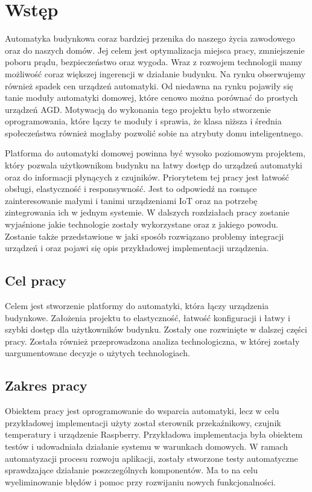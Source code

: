 \chapter{Wstęp}
Automatyka budynkowa coraz bardziej przenika do naszego życia zawodowego oraz do naszych domów. Jej celem jest optymalizacja miejsca pracy, zmniejszenie poboru prądu, bezpieczeństwo oraz wygoda. Wraz z rozwojem technologii mamy możliwość coraz większej ingerencji w działanie budynku. Na rynku obserwujemy również spadek cen urządzeń automatyki. Od niedawna na rynku pojawiły się tanie moduły automatyki domowej, które cenowo można porównać do prostych urządzeń AGD. Motywacją do wykonania tego projektu było stworzenie oprogramowania, które łączy te moduły i sprawia, że klasa niższa i średnia społeczeństwa również mogłaby pozwolić sobie na atrybuty domu inteligentnego. \par
Platforma do automatyki domowej powinna być wysoko poziomowym projektem, który pozwala użytkownikom budynku na łatwy dostęp do urządzeń automatyki oraz do informacji płynących z czujników. Priorytetem tej pracy jest łatwość obsługi, elastyczność i responsywność. Jest to odpowiedź na rosnące zainteresowanie małymi i tanimi urządzeniami IoT oraz na potrzebę zintegrowania ich w jednym systemie. W dalszych rozdziałach pracy zostanie wyjaśnione jakie technologie zostały wykorzystane oraz z jakiego powodu.  Zostanie także przedstawione w jaki sposób rozwiązano problemy integracji urządzeń i oraz pojawi się opis przykładowej implementacji urządzenia.
\section{Cel pracy}
    Celem jest stworzenie platformy do automatyki, która łączy urządzenia budynkowe. Założenia projektu to elastyczność, łatwość konfiguracji i łatwy i szybki dostęp dla użytkowników budynku. Zostały one rozwinięte w dalszej części pracy. \newline
    Została również przeprowadzona analiza technologiczna, w której zostały uargumentowane decyzje o użytych technologiach. 
\section{Zakres pracy}
Obiektem pracy jest oprogramowanie do wsparcia automatyki, lecz w celu przykładowej implementacji użyty został sterownik przekaźnikowy, czujnik temperatury i urządzenie Raspberry. Przykładowa implementacja była obiektem testów i udowadniała działanie systemu w warunkach domowych. W ramach automatyzacji procesu rozwoju aplikacji, zostały stworzone testy automatyczne sprawdzające działanie poszczególnych komponentów. Ma to na celu wyeliminowanie błędów i pomoc przy rozwijaniu nowych funkcjonalności.
